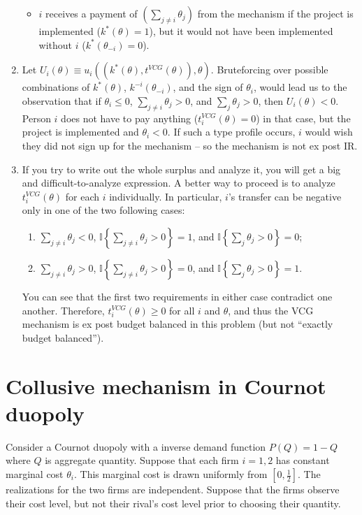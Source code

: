 \documentclass[a4paper]{article}
\begin{document}
\begin{enumerate}
\begin{itemize}
			\item $i$ receives a payment of $\left(\sum_{j\neq i} \theta_j \right)$ from the mechanism if the project is implemented ($k^*(\theta)=1$), but it would not have been implemented without $i$ ($k^*(\theta_{-i})=0$).
		\end{itemize}
		
		\item Let $U_i(\theta) \equiv u_i((k^*(\theta),t^{VCG}(\theta)),\theta)$. Bruteforcing over possible combinations of $k^*(\theta)$, $k^{-i}(\theta_{-i})$, and the sign of $\theta_i$, would lead us to the observation that if $\theta_i \leq 0$, $\sum_{j \neq i} \theta_j > 0$, and $\sum_j \theta_j > 0$, then $U_i(\theta) < 0$. Person $i$ does not have to pay anything ($t^{VCG}_i(\theta)=0$) in that case, but the project is implemented and $\theta_i < 0$. If such a type profile occurs, $i$ would wish they did not sign up for the mechanism -- so the mechanism is not ex post IR.
		
		\item If you try to write out the whole surplus and analyze it, you will get a big and difficult-to-analyze expression. A better way to proceed is to analyze $t_i^{VCG}(\theta)$ for each $i$ individually. In particular, $i$'s transfer can be negative only in one of the two following cases:
		\begin{enumerate}
			\item $\sum_{j\neq i} \theta_j < 0$, $\mathbb{I}\left\{ \sum_{j \neq i} \theta_j > 0 \right\}=1$, and $\mathbb{I}\left\{ \sum_j \theta_j > 0 \right\}=0$;
			\item $\sum_{j\neq i} \theta_j > 0$, $\mathbb{I}\left\{ \sum_{j \neq i} \theta_j > 0 \right\}=0$, and $\mathbb{I}\left\{ \sum_j \theta_j > 0 \right\}=1$.
		\end{enumerate}
		You can see that the first two requirements in either case contradict one another. Therefore, $t_i^{VCG}(\theta) \geq 0$ for all $i$ and $\theta$, and thus the VCG mechanism is ex post budget balanced in this problem (but not ``exactly budget balanced'').
	\end{enumerate}
\fi



\section{Collusive mechanism in Cournot duopoly}
Consider a Cournot duopoly with a inverse demand function $P(Q)=1-Q$ where $Q$ is aggregate quantity. Suppose that each firm $i=1,2$ has constant marginal cost $\theta_i$. This marginal cost is drawn uniformly from $[0,\frac{1}{2}]$. The realizations for the two firms are independent. Suppose that the firms observe their cost level, but not their rival’s cost level prior to choosing their quantity.  
\end{document}
